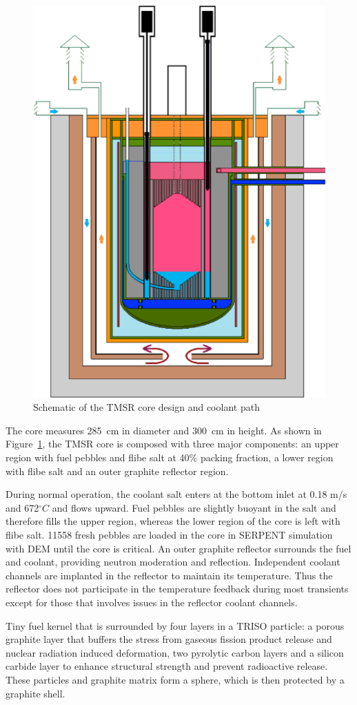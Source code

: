 \documentclass{elsarticle}
\begin{document}
\begin{figure}[h]
    \centering
    \includegraphics[width=0.6\columnwidth]{./images/design/TMSR_geom.png}
    \caption{Schematic of the TMSR core design and coolant path}
    \label{fig:TMSR}
\end{figure}

The core measures 285~cm in diameter and 300~cm in height. As shown in Figure~\ref{fig:TMSR}, the TMSR core is composed with three major components: an upper region with fuel pebbles and flibe salt at 40\% packing fraction, a lower region with flibe salt and an outer graphite reflector region. 

During normal operation, the coolant salt enters at the bottom inlet at 0.18 m/s and 672$^{\circ}C$ and flows upward. 
Fuel pebbles are slightly buoyant in the salt and therefore fills the upper region, whereas the lower region of the core is left with flibe salt. 11558 fresh pebbles are loaded in the core in SERPENT simulation with DEM until the core is critical. An outer graphite reflector surrounds the fuel and coolant, providing neutron moderation and reflection. Independent coolant channels are implanted in the reflector to maintain its temperature. Thus the reflector does not participate in the temperature feedback during most transients except for those that involves issues in the reflector coolant channels.

Tiny fuel kernel that is surrounded by four layers in a TRISO particle: a porous graphite layer that buffers the stress from gaseous fission product release and nuclear radiation induced deformation, two pyrolytic carbon layers and a silicon carbide layer to enhance structural strength and prevent radioactive release.  These particles and graphite matrix form a sphere, which is then protected by a graphite shell. 
\end{document}
